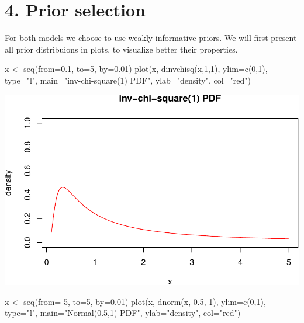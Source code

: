 \documentclass[
]{article}
\newenvironment{Shaded}{\begin{snugshade}}{\end{snugshade}}
\newcommand{\AttributeTok}[1]{\textcolor[rgb]{0.77,0.63,0.00}{#1}}
\newcommand{\DecValTok}[1]{\textcolor[rgb]{0.00,0.00,0.81}{#1}}
\newcommand{\FloatTok}[1]{\textcolor[rgb]{0.00,0.00,0.81}{#1}}
\newcommand{\FunctionTok}[1]{\textcolor[rgb]{0.00,0.00,0.00}{#1}}
\newcommand{\NormalTok}[1]{#1}
\newcommand{\OtherTok}[1]{\textcolor[rgb]{0.56,0.35,0.01}{#1}}
\newcommand{\SpecialCharTok}[1]{\textcolor[rgb]{0.00,0.00,0.00}{#1}}
\newcommand{\StringTok}[1]{\textcolor[rgb]{0.31,0.60,0.02}{#1}}
\begin{document}
\newpage

\hypertarget{prior-selection}{%
\section{4. Prior selection}\label{prior-selection}}

For both models we choose to use weakly informative priors. We will
first present all prior distribuions in plots, to visualize better their
properties.

\begin{Shaded}
\begin{Highlighting}[]
\NormalTok{x }\OtherTok{\textless{}{-}} \FunctionTok{seq}\NormalTok{(}\AttributeTok{from=}\FloatTok{0.1}\NormalTok{, }\AttributeTok{to=}\DecValTok{5}\NormalTok{, }\AttributeTok{by=}\FloatTok{0.01}\NormalTok{)}
\FunctionTok{plot}\NormalTok{(x, }\FunctionTok{dinvchisq}\NormalTok{(x,}\DecValTok{1}\NormalTok{,}\DecValTok{1}\NormalTok{), }\AttributeTok{ylim=}\FunctionTok{c}\NormalTok{(}\DecValTok{0}\NormalTok{,}\DecValTok{1}\NormalTok{), }\AttributeTok{type=}\StringTok{"l"}\NormalTok{, }\AttributeTok{main=}\StringTok{"inv{-}chi{-}square(1) PDF"}\NormalTok{,}
     \AttributeTok{ylab=}\StringTok{"density"}\NormalTok{, }\AttributeTok{col=}\StringTok{"red"}\NormalTok{)}
\end{Highlighting}
\end{Shaded}

\includegraphics{bda_project_files/figure-latex/unnamed-chunk-10-1.pdf}

\begin{Shaded}
\begin{Highlighting}[]
\NormalTok{x }\OtherTok{\textless{}{-}} \FunctionTok{seq}\NormalTok{(}\AttributeTok{from=}\SpecialCharTok{{-}}\DecValTok{5}\NormalTok{, }\AttributeTok{to=}\DecValTok{5}\NormalTok{, }\AttributeTok{by=}\FloatTok{0.01}\NormalTok{)}
\FunctionTok{plot}\NormalTok{(x, }\FunctionTok{dnorm}\NormalTok{(x, }\FloatTok{0.5}\NormalTok{, }\DecValTok{1}\NormalTok{), }\AttributeTok{ylim=}\FunctionTok{c}\NormalTok{(}\DecValTok{0}\NormalTok{,}\DecValTok{1}\NormalTok{), }\AttributeTok{type=}\StringTok{"l"}\NormalTok{, }\AttributeTok{main=}\StringTok{"Normal(0.5,1) PDF"}\NormalTok{,}
     \AttributeTok{ylab=}\StringTok{"density"}\NormalTok{, }\AttributeTok{col=}\StringTok{"red"}\NormalTok{)}
\end{Highlighting}
\end{Shaded}
\end{document}
